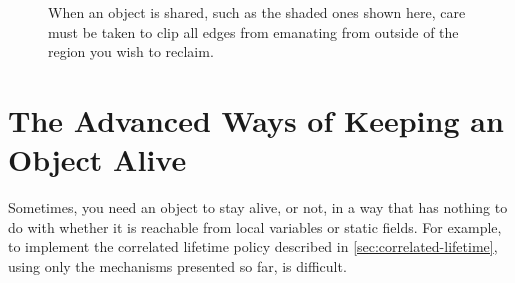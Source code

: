 \begin{figure}
\centering
{}
\qquad
{}
	\caption{When an object is shared, such as the shaded ones shown
	here, care must be taken to clip all edges from emanating from outside of the
	region you wish to reclaim.}
	\label{fig:reachability-sharing}
\end{figure}

\section{The Advanced Ways of Keeping an Object Alive}
Sometimes, you need an object to stay alive, or not, in a way that has nothing
to do with whether it is reachable from local variables or static fields. For
example, to implement the correlated lifetime policy described in
\autoref{sec:correlated-lifetime}, using only the mechanisms presented so far,
is difficult. 

